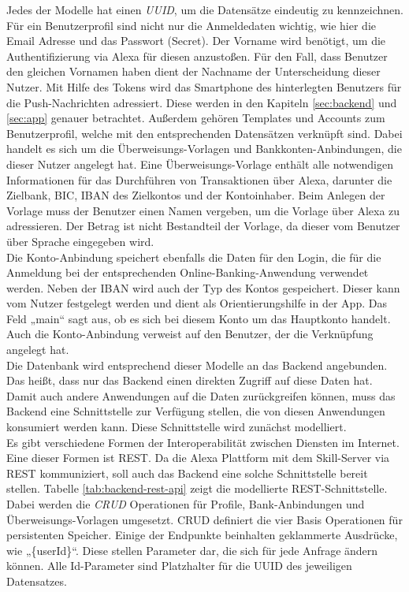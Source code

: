 Jedes der Modelle hat einen \textit{\ac{UUID}}, um die Datensätze eindeutig zu kennzeichnen. Für ein Benutzerprofil sind nicht nur die Anmeldedaten wichtig, wie hier die Email Adresse und das Passwort (Secret). Der Vorname wird benötigt, um die Authentifizierung via Alexa für diesen anzustoßen. Für den Fall, dass Benutzer den gleichen Vornamen haben dient der Nachname der Unterscheidung dieser Nutzer. Mit Hilfe des Tokens wird das Smartphone des hinterlegten Benutzers für die Push-Nachrichten adressiert. Diese werden in den Kapiteln \ref{sec:backend} und \ref{sec:app} genauer betrachtet. Außerdem gehören Templates und Accounts zum Benutzerprofil, welche mit den entsprechenden Datensätzen verknüpft sind. Dabei handelt es sich um die Überweisungs-Vorlagen und Bankkonten-Anbindungen, die dieser Nutzer angelegt hat. Eine Überweisungs-Vorlage enthält alle notwendigen Informationen für das Durchführen von Transaktionen über Alexa, darunter die Zielbank, \ac{BIC}, \ac{IBAN} des Zielkontos und der Kontoinhaber. Beim Anlegen der Vorlage muss der Benutzer einen Namen vergeben, um die Vorlage über Alexa zu adressieren. Der Betrag ist nicht Bestandteil der Vorlage, da dieser vom Benutzer über Sprache eingegeben wird.\\ 
Die Konto-Anbindung speichert ebenfalls die Daten für den Login, die für die Anmeldung bei der entsprechenden Online-Banking-Anwendung verwendet werden. Neben der \ac{IBAN} wird auch der Typ des Kontos gespeichert. Dieser kann vom Nutzer festgelegt werden und dient als Orientierungshilfe in der App. Das Feld „main“ sagt aus, ob es sich bei diesem Konto um das Hauptkonto handelt. Auch die Konto-Anbindung verweist auf den Benutzer, der die Verknüpfung angelegt hat.\\
Die Datenbank wird entsprechend dieser Modelle an das Backend angebunden. Das heißt, dass nur das Backend einen direkten Zugriff auf diese Daten hat. Damit auch andere Anwendungen auf die Daten zurückgreifen können, muss das Backend eine Schnittstelle zur Verfügung stellen, die von diesen Anwendungen konsumiert werden kann. Diese Schnittstelle wird zunächst modelliert.\\
Es gibt verschiedene Formen der Interoperabilität zwischen Diensten im Internet. Eine dieser Formen ist \ac{REST}. Da die Alexa Plattform mit dem Skill-Server via \ac{REST} kommuniziert, soll auch das Backend eine solche Schnittstelle bereit stellen. Tabelle \ref{tab:backend-rest-api} zeigt die modellierte \ac{REST}-Schnittstelle. Dabei werden die \textit{\ac{CRUD}} Operationen für Profile, Bank-Anbindungen und Überweisungs-Vorlagen umgesetzt. \ac{CRUD} definiert die vier Basis Operationen für persistenten Speicher. Einige der Endpunkte beinhalten geklammerte Ausdrücke, wie \zB „\{userId\}“. Diese stellen Parameter dar, die sich für jede Anfrage ändern können. Alle Id-Parameter sind Platzhalter für die \ac{UUID} des jeweiligen Datensatzes. 

